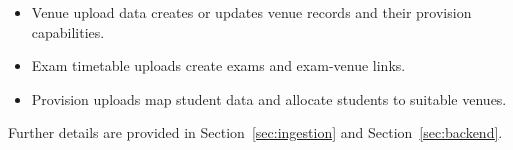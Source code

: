 \begin{itemize}
  \item Venue upload data creates or updates venue records and their provision capabilities.
  \item Exam timetable uploads create exams and exam-venue links.
  \item Provision uploads map student data and allocate students to suitable venues.
\end{itemize}

Further details are provided in Section~\ref{sec:ingestion} and Section~\ref{sec:backend}.
